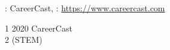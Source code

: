 \documentclass{article}
\begin{document}
\linespread{1}  %
\begin{frame}{\textbf{ }}
\linespread{1} %

	\begin{table}[htbp]
		\centering %
		\caption{CareerCast  } %
		\extrarowheight=2pt %
		\label{CareerCast} %
		\par\smallskip
		\hspace{0.6em}\parbox{0.8\textwidth}{\scriptsize
		 : CareerCast,  : \url{https://www.careercast.com} \par
		\setlength{\hangindent}{1.8em}
		 1 2020   CareerCast  \\
		 2  (STEM)  
		}
	\end{table}

\end{frame}


\section{ }

\end{document}
